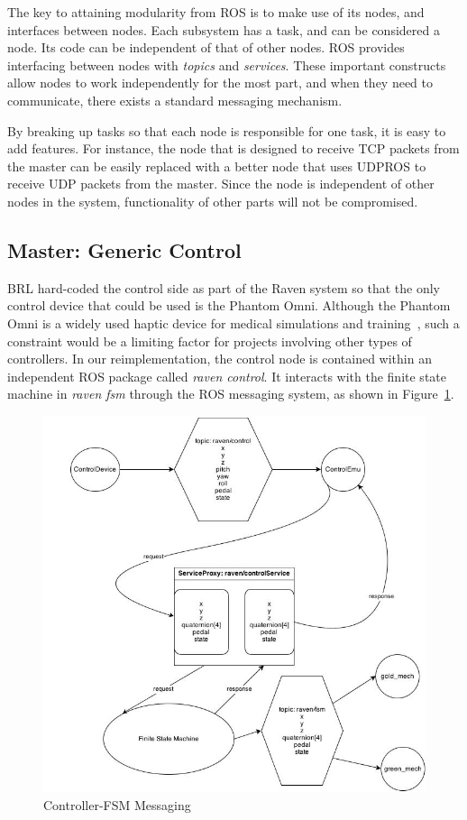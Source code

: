 \documentclass[letterpaper,twocolumn,10pt]{article}
\begin{document}
The key to attaining modularity from ROS is to make use of its nodes, 
and interfaces between nodes. Each subsystem has a task, and can be 
considered a node. Its code can be independent of that of other nodes. 
ROS provides interfacing between nodes with \emph{topics} and 
\emph{services}. These important constructs allow nodes to work 
independently for the most part, and when they need to communicate, 
there exists a standard messaging mechanism.

By breaking up tasks so that each node is responsible for one task, 
it is easy to add features. For instance, the node that is designed 
to receive TCP packets from the master can be easily replaced with 
a better node that uses UDPROS to receive UDP packets from the master. 
Since the node is independent of other nodes in the system, 
functionality of other parts will not be compromised.

\subsection{Master: Generic Control}

BRL hard-coded the control side as part of the Raven system so that
the only control device that could be used is the Phantom Omni. Although the
Phantom Omni is a widely used haptic device for medical simulations and
training~\cite{2}, such a constraint would be a limiting factor for projects
involving other types of controllers. In our reimplementation, the
control node is contained within an independent ROS package called
\emph{raven control}. It interacts with the finite state machine in
\emph{raven fsm} through the ROS messaging system, as shown in
Figure~\ref{fig:control_diagram}.

\begin{figure}[h]
  \includegraphics[width=1.0\columnwidth]{ControlDiagram.jpg}
  \caption{Controller-FSM Messaging}
  \label{fig:control_diagram}
\end{figure}
\end{document}
